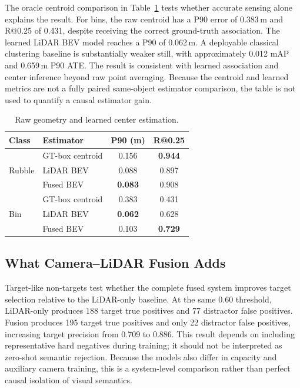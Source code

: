 \documentclass[conference]{IEEEtran}
\begin{document}
The oracle centroid comparison in Table~\ref{tab:geometry} tests whether accurate sensing alone explains the result. For bins, the raw centroid has a P90 error of 0.383\,m and R@0.25 of 0.431, despite receiving the correct ground-truth association. The learned LiDAR BEV model reaches a P90 of 0.062\,m. A deployable classical clustering baseline is substantially weaker still, with approximately 0.012 mAP and 0.659\,m P90 ATE. The result is consistent with learned association and center inference beyond raw point averaging. Because the centroid and learned metrics are not a fully paired same-object estimator comparison, the table is not used to quantify a causal estimator gain.

\begin{table}[t]
\caption{Raw geometry and learned center estimation.}
\label{tab:geometry}
\centering
\small
\begin{tabular}{llcc}
\toprule
\textbf{Class} & \textbf{Estimator} & \textbf{P90 (m)} & \textbf{R@0.25} \\
\midrule
\multirow{3}{*}{Rubble}
 & GT-box centroid & 0.156 & \textbf{0.944} \\
 & LiDAR BEV & 0.088 & 0.897 \\
 & Fused BEV & \textbf{0.083} & 0.908 \\
\midrule
\multirow{3}{*}{Bin}
 & GT-box centroid & 0.383 & 0.431 \\
 & LiDAR BEV & \textbf{0.062} & 0.628 \\
 & Fused BEV & 0.103 & \textbf{0.729} \\
\bottomrule
\end{tabular}
\end{table}

\subsection{What Camera--LiDAR Fusion Adds}

Target-like non-targets test whether the complete fused system improves target selection relative to the LiDAR-only baseline. At the same 0.60 threshold, LiDAR-only produces 188 target true positives and 77 distractor false positives. Fusion produces 195 target true positives and only 22 distractor false positives, increasing target precision from 0.709 to 0.886. This result depends on including representative hard negatives during training; it should not be interpreted as zero-shot semantic rejection. Because the models also differ in capacity and auxiliary camera training, this is a system-level comparison rather than perfect causal isolation of visual semantics.
\end{document}
